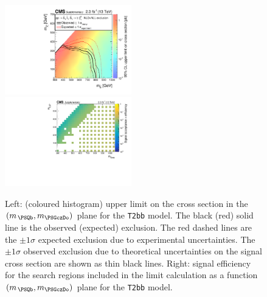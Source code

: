 \clearpage
\begin{figure}[!h]
  \begin{center}
    \includegraphics[width=0.49\textwidth]{RA1T2bbXSEC_aux} \, 
    \includegraphics[width=0.49\textwidth]{T2bb_merging_4_cats_aux} \,     
  \end{center}
  \caption{Left: (coloured histogram) upper limit on the cross section in the $(m_{\,\PSQb}, m_{\PSGczDo})$ plane for the \texttt{T2bb} model. 
  The black (red) solid line is the observed (expected) exclusion. The red dashed lines are the $\pm1\sigma$ expected exclusion due to experimental uncertainties. 
  The $\pm1\sigma$ observed exclusion due to theoretical uncertainties on the signal cross section are shown as thin black lines. 
  Right: signal efficiency for the search regions included in the limit calculation as a function $(m_{\,\PSQb}, m_{\PSGczDo})$ plane for the \texttt{T2bb} model. 
  \label{fig:T2bb_excl}}
\end{figure}



